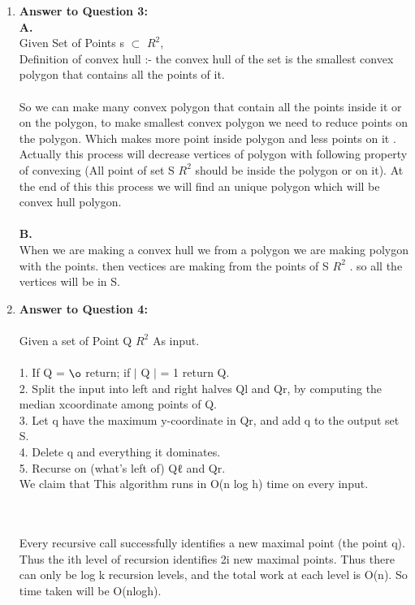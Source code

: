 \documentclass[11pt]{article}
\begin{document}
\begin{enumerate}
% 
% 
% 
% 
\item \textbf{Answer to Question 3:} \\
\quad \textbf{A.}\\
Given Set of Points s $\subset$ $R^2$, \\
Definition of convex hull :- the convex hull of the set is the smallest convex polygon that contains all the points of it.\\
\\ So we can make many convex polygon that contain all the points inside it or on the polygon, to make smallest convex polygon we need to reduce points on the polygon. Which makes more point inside polygon and less points on it . Actually this process will decrease vertices of polygon with following property of convexing (All point of set S \subset $R^2$ should be inside the polygon or on it). 
At the end of this this process we will find an unique polygon which will be convex hull polygon. \\ \\
\quad \textbf{B.}\\
When we are making a convex hull we from a polygon we are making polygon with the points. then vectices are making from the points of S \subset $R^2$ . so all the vertices will be in S. \\
% 
% 
% 
% 
\newpage 
\item \textbf{Answer to Question 4:} \\ \\
Given a set of Point Q \subset $R^2$ As input.\\\\
1. If Q = $\o$   return; if $|$ Q $|$ = 1 return Q.\\
2. Split the input into left and right halves Ql and Qr, by computing the median xcoordinate among points of Q.\\
3. Let q have the maximum y-coordinate in Qr, and add q to the output set S.\\
4. Delete q and everything it dominates. \\ 
5. Recurse on (what’s left of) Qℓ and Qr. \\ 
 We claim that This algorithm runs in O(n log h) time on every input.
 
 \\ \\ 
  Every recursive call successfully identifies a new maximal
point (the point q). Thus the ith level of recursion identifies 2i new maximal points. Thus
there can only be log k recursion levels, and the total work at each level is O(n).
So time taken will be O(nlogh).













\end{enumerate}
\end{document}
